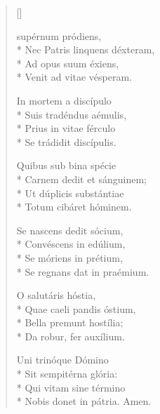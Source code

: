 \newHymn
{}

\JustHymnNum

\pointtrans
\begin{multicols}{2}
\begin{verse}[\versewidth]

 supérnum pródiens,\\*
Nec Patris linquens déxteram,\\*
Ad opus suum éxiens,           \\*
Venit ad vitae vésperam.

In mortem a discípulo  \\*
Suis tradéndus aémulis,  \\*
Prius in vitae férculo     \\*
Se trádidit discípulis. 

Quibus sub bina spécie   \\*
Carnem dedit et sánguinem; \\*
Ut dúplicis substántiae      \\*
Totum cibáret hóminem.         

Se nascens dedit sócium,\\*
Convéscens in edúlium,    \\*
Se móriens in prétium,      \\*
Se regnans dat in praémium.  

O salutáris hóstia, \\*
Quae caeli pandis óstium,\\*
Bella premunt hostília;    \\*
Da robur, fer auxílium.      

Uni trinóque Dómino   \\*
Sit sempitérna glória:  \\*
Qui vitam sine término    \\*
Nobis donet in pátria. Amen.

\end{verse}
\end{multicols}


\newHymn

\label{hymn:OSavingVictim}

